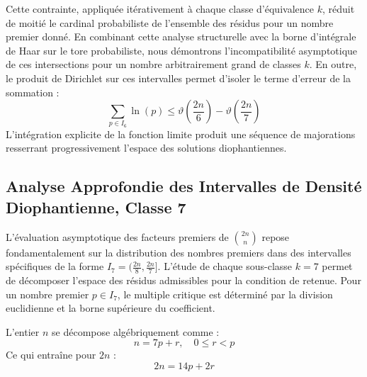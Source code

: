 \documentclass[12pt,a4paper]{article}
\begin{document}
    Cette contrainte, appliquée itérativement à chaque classe d'équivalence $k$, réduit de moitié le cardinal probabiliste de l'ensemble des résidus pour un nombre premier donné.
    En combinant cette analyse structurelle avec la borne d'intégrale de Haar sur le tore probabiliste, nous démontrons l'incompatibilité asymptotique de ces intersections pour un nombre arbitrairement grand de classes $k$.
    En outre, le produit de Dirichlet sur ces intervalles permet d'isoler le terme d'erreur de la sommation :
    \begin{equation}
    \sum_{p \in I_6} \ln(p) \le \vartheta\left(\frac{2n}{6}\right) - \vartheta\left(\frac{2n}{7}\right)
    \end{equation}
    L'intégration explicite de la fonction limite produit une séquence de majorations resserrant progressivement l'espace des solutions diophantiennes.
    
    \newpage
    \subsection{Analyse Approfondie des Intervalles de Densité Diophantienne, Classe 7}
    L'évaluation asymptotique des facteurs premiers de $\binom{2n}{n}$ repose fondamentalement sur la distribution des nombres premiers dans des intervalles spécifiques de la forme $I_7 = (\frac{2n}{8}, \frac{2n}{7}]$.
    L'étude de chaque sous-classe $k = 7$ permet de décomposer l'espace des résidus admissibles pour la condition de retenue.
    Pour un nombre premier $p \in I_7$, le multiple critique est déterminé par la division euclidienne et la borne supérieure du coefficient.

    L'entier $n$ se décompose algébriquement comme :
    \begin{equation}
    n = 7 p + r, \quad 0 \le r < p
    \end{equation}
    Ce qui entraîne pour $2n$ :
    \begin{equation}
    2n = 14 p + 2r
    \end{equation}
\end{document}
